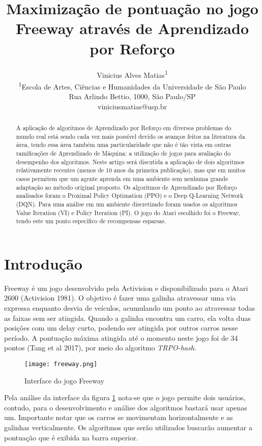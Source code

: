 \documentclass[letterpaper]{article} %
\title{Maximização de pontuação no jogo Freeway através de Aprendizado por Reforço}
\author{Vinicius Alves Matias\textsuperscript{\rm 1} \\ 
\textsuperscript{\rm 1}Escola de Artes, Ciências e Humanidades da Universidade de São Paulo\\ %
Rua Arlindo Bettio, 1000, São Paulo/SP\\
viniciusmatias@usp.br %
}
\begin{document}
\maketitle

\begin{abstract}
A aplicação de algoritmos de Aprendizado por Reforço em diversos problemas do mundo real está sendo cada vez mais possível devido os avanços feitos na literatura da área, tendo essa área também uma particularidade que não é tão vista em outras ramificações de Aprendizado de Máquina: a utilização de jogos para avaliação do desempenho dos algoritmos. Neste artigo será discutida a aplicação de dois algoritmos relativamente recentes (menos de 10 anos da primeira publicação), mas que em muitos casos permitem que um agente aprenda em uma ambiente sem nenhuma grande adaptação ao método original proposto. Os algoritmos de Aprendizado por Reforço analisados foram o Proximal Policy Optimation (PPO) e o Deep Q-Learning Network (DQN). Para uma análise em um ambiente discretizado foram usados os algoritmos Value Iteration (VI) e Policy Iteration (PI). O jogo do Atari escolhido foi o Freeway, tendo este um ponto específico de recompensas esparsas. 
\end{abstract}

\section{Introdução}
Freeway é um jogo desenvolvido pela Activision e disponibilizado para o Atari 2600 (Activision 1981). O objetivo é fazer uma galinha atravessar uma via expressa enquanto desvia de veículos, acumulando um ponto ao atravessar todas as faixas sem ser atingida. Quando a galinha encontra um carro, ela volta duas posições com um delay curto, podendo ser atingida por outros carros nesse período. A pontuação máxima atingida até o momento neste jogo foi de 34 pontos (Tang et al 2017), por meio do algoritmo \textit{TRPO-hash}.

\begin{figure}[h]
\centering
\texttt{[image: freeway.png]}
\caption{Interface do jogo Freeway}
\label{fig:freeway}
\end{figure}

Pela análise da interface da figura \ref{fig:freeway} nota-se que o jogo permite dois usuários, contudo, para o desenvolvimento e análise dos algoritmos bastará usar apenas um. Importante notar que os carros se movimentam horizontalmente e as galinhas verticalmente. Os algoritmos que serão utilizados buscarão aumentar a pontuação que é exibida na barra superior.
\end{document}
